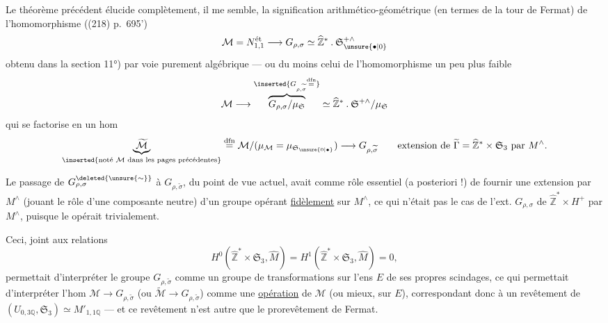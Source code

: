  Le théorème précédent élucide complètement, il me semble, la signification arithmético-géométrique (en termes de la tour de Fermat) de l'homomorphisme ((218) p.~695')
\[
\mathcal M=N_{1,1}^{\text{ét}}\longrightarrow G_{\rho,\sigma}\simeq\widehat{\mathbb Z}^{*}\mathbin{.}\mathfrak S_{\unsure{\bullet|0}}^{+\wedge}
\]
obtenu dans la section 11°) par voie purement algébrique --- ou du moins celui de l'homomorphisme un peu plus faible
\[
\mathcal M\longrightarrow\overbrace{G_{\rho,\sigma}/\mu_{\mathfrak S}}^{\inserted{G_{\rho,\widetilde{\sigma}}\overset{\mathrm{dfn}}{=}}}\simeq\widehat{\mathbb Z}^{*}\mathbin{.}\mathfrak S^{+\wedge}/\mu_{\mathfrak S}
\]
qui se factorise  en un hom
\[
\underbrace{\widetilde{\mathcal M}}_{\inserted{\text{noté }\mathcal M\text{ dans les pages précédentes}}}\overset{\mathrm{dfn}}{=}\mathcal M/(\mu_{\mathcal M}=\mu_{\mathfrak S_{\unsure{0|\bullet}}})\longrightarrow G_{\rho,\widetilde{\sigma}}
\qquad\text{extension de }\widetilde\Gamma=\widehat{\mathbb Z}^{*}\times\mathfrak S_3\text{ par }M^\wedge.
\]

Le passage de $G_{\rho,\sigma}^{\deleted{\unsure{\sim}}}$ à $G_{\rho,\widetilde{\sigma}}$, du point de vue actuel, avait comme rôle essentiel (a posteriori !) de fournir une extension par $M^\wedge$ (jouant le rôle d'une composante neutre) d'un groupe opérant \uline{fidèlement} sur $M^\wedge$, ce qui n'était pas le cas de l'ext. $G_{\rho,\sigma}$ de $\widehat{\mathbb Z}^{*}\times H^+$ par $M^\wedge$, puisque le   opérait trivialement.



Ceci, joint aux relations
\[
H^0(\widehat{\mathbb Z}^{*}\times\mathfrak S_3,\widehat M)=H^1(\widehat{\mathbb Z}^{*}\times\mathfrak S_3,\widehat M)=0,
\]
permettait d'interpréter le groupe $G_{\rho,\widetilde\sigma}$ comme un groupe de transformations sur l'ens $E$ de ses propres scindages, ce qui permettait d'interpréter l'hom $\mathcal M\to G_{\rho,\widetilde\sigma}$ (ou $\widetilde{\mathcal M}\to G_{\rho,\widetilde\sigma}$) comme une  \uline{opération} de $\mathcal M$  (ou mieux,  sur $E$), correspondant donc à un revêtement  de $(U_{0,3\mathbb Q},\mathfrak S_3)\simeq M'_{1,1\mathbb Q}$ --- et ce revêtement n'est autre que le prorevêtement de Fermat.


